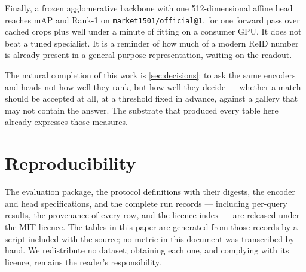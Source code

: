 Finally, a frozen agglomerative backbone with one 512-dimensional affine head reaches
\bestMarketMAP{} mAP and \bestMarketRone{} Rank-1 on \texttt{market1501/official@1}, for one
forward pass over cached crops plus well under a minute of fitting on a consumer GPU. It does
not beat a tuned specialist. It is a reminder of how much of a modern ReID number is already
present in a general-purpose representation, waiting on the readout.

The natural completion of this work is \cref{sec:decisions}: to ask the same encoders and heads
not how well they rank, but how well they decide --- whether a match should be accepted at all,
at a threshold fixed in advance, against a gallery that may not contain the answer. The
substrate that produced every table here already expresses those measures.

\section*{Reproducibility}
The evaluation package, the protocol definitions with their digests, the encoder and head
specifications, and the complete run records --- including per-query results, the provenance of
every row, and the licence index --- are released under the MIT licence. The tables in this
paper are generated from those records by a script included with the source; no metric in this
document was transcribed by hand. We redistribute no dataset; obtaining each one, and complying
with its licence, remains the reader's responsibility.
